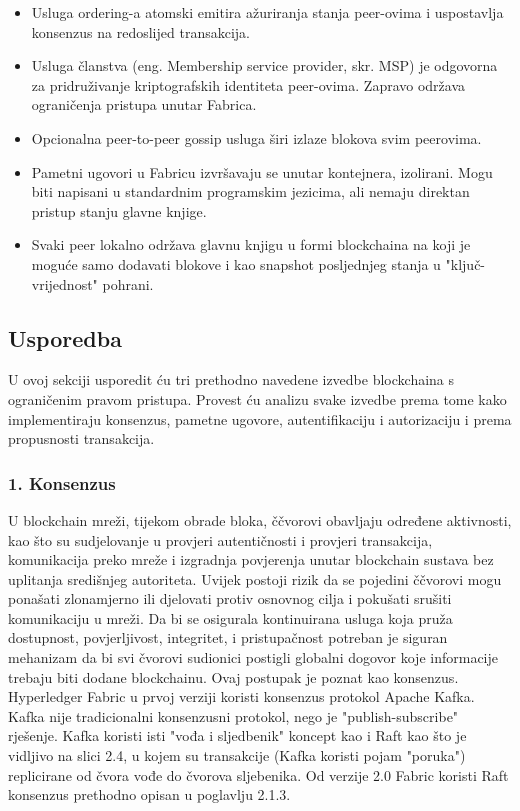 \documentclass[times, utf8, diplomski]{fer}
\begin{document}
\begin{itemize}

\item Usluga ordering-a atomski emitira ažuriranja stanja peer-ovima i uspostavlja konsenzus na redoslijed transakcija.

\item Usluga članstva (eng. Membership service provider, skr. MSP) je odgovorna za pridruživanje kriptografskih identiteta peer-ovima. Zapravo održava ograničenja pristupa unutar Fabrica.

\item Opcionalna peer-to-peer gossip usluga širi izlaze blokova svim peerovima.

\item Pametni ugovori u Fabricu izvršavaju se unutar kontejnera, izolirani. Mogu biti napisani u standardnim programskim jezicima, ali nemaju direktan pristup stanju glavne knjige.

\item Svaki peer lokalno održava glavnu knjigu u formi blockchaina na koji je moguće samo dodavati blokove i kao snapshot posljednjeg stanja u "ključ-vrijednost" pohrani.

\end{itemize}

\subsection{Usporedba}

U ovoj sekciji usporedit ću tri prethodno navedene izvedbe blockchaina s ograničenim pravom pristupa. Provest ću analizu svake izvedbe prema tome kako implementiraju konsenzus, pametne ugovore, autentifikaciju i autorizaciju i prema propusnosti transakcija.

\subsubsection{1.  Konsenzus}

U blockchain mreži, tijekom obrade bloka, ččvorovi obavljaju određene aktivnosti, kao što su sudjelovanje u provjeri autentičnosti i provjeri transakcija, komunikacija preko mreže i izgradnja povjerenja unutar blockchain sustava bez uplitanja središnjeg autoriteta. Uvijek postoji rizik da se pojedini ččvorovi mogu ponašati zlonamjerno ili djelovati protiv osnovnog cilja i pokušati srušiti komunikaciju u mreži. Da bi se osigurala kontinuirana usluga koja pruža dostupnost, povjerljivost, integritet, i pristupačnost potreban je siguran mehanizam da bi svi čvorovi sudionici postigli globalni dogovor koje
informacije trebaju biti dodane blockchainu. Ovaj postupak je poznat kao konsenzus.
Hyperledger Fabric u prvoj verziji koristi konsenzus protokol Apache Kafka. Kafka nije tradicionalni konsenzusni protokol, nego je "publish-subscribe" rješenje. Kafka koristi isti "vođa i sljedbenik" koncept kao i Raft kao što je vidljivo na slici 2.4, u kojem su transakcije (Kafka koristi pojam "poruka") replicirane od čvora vođe do čvorova sljebenika. Od verzije 2.0 Fabric koristi Raft konsenzus prethodno opisan u poglavlju 2.1.3.
\end{document}

